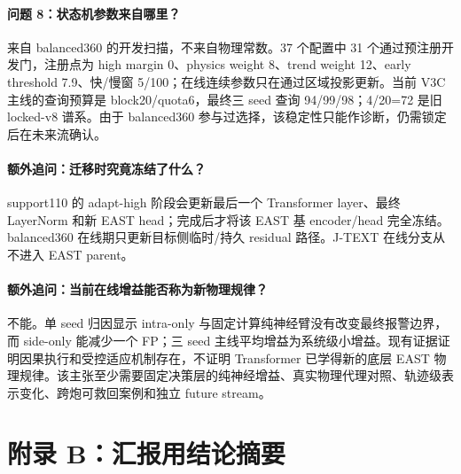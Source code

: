 \documentclass[11pt,a4paper]{article}
\begin{document}
\paragraph{问题 8：状态机参数来自哪里？}
来自 balanced360 的开发扫描，不来自物理常数。37 个配置中 31 个通过预注册开发门，注册点为 high margin 0、physics weight 8、trend weight 12、early threshold 7.9、快/慢窗 5/100；在线连续参数只在通过区域投影更新。当前 V3C 主线的查询预算是 block20/quota6，最终三 seed 查询 94/99/98；4/20=72 是旧 locked-v8 谱系。由于 balanced360 参与过选择，该稳定性只能作诊断，仍需锁定后在未来流确认。

\paragraph{额外追问：迁移时究竟冻结了什么？}
support110 的 adapt-high 阶段会更新最后一个 Transformer layer、最终 LayerNorm 和新 EAST head；完成后才将该 EAST 基 encoder/head 完全冻结。balanced360 在线期只更新目标侧临时/持久 residual 路径。J-TEXT 在线分支从不进入 EAST parent。

\paragraph{额外追问：当前在线增益能否称为新物理规律？}
不能。单 seed 归因显示 intra-only 与固定计算纯神经臂没有改变最终报警边界，而 side-only 能减少一个 FP；三 seed 主线平均增益为系统级小增益。现有证据证明因果执行和受控适应机制存在，不证明 Transformer 已学得新的底层 EAST 物理规律。该主张至少需要固定决策层的纯神经增益、真实物理代理对照、轨迹级表示变化、跨炮可救回案例和独立 future stream。

\section*{附录 B：汇报用结论摘要}
\end{document}
